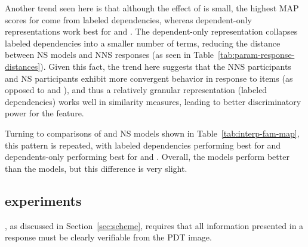 Another trend seen here is that although the effect of  is small, the highest MAP scores for  come from labeled dependencies, whereas dependent-only representations work best for  and . The dependent-only representation collapses labeled dependencies into a smaller number of terms, reducing the distance between NS models and NNS responses (as seen in Table~\ref{tab:param-response-distances}). Given this fact, the trend here suggests that the NNS participants and  NS participants exhibit more convergent behavior in response to  items (as opposed to  and ), and thus a relatively granular representation (labeled dependencies) works well in similarity measures, leading to better discriminatory power for the  feature.

Turning to comparisons of  and  NS models shown in Table~\ref{tab:interp-fam-map}, this pattern is repeated, with labeled dependencies performing best for  and dependents-only performing best for  and . Overall, the  models perform better than the  models, but this difference is very slight.



\subsection{ experiments}
\label{sec:map-verif}

, as discussed in Section~\ref{sec:scheme}, requires that all information presented in a response must be clearly verifiable from the PDT image.


